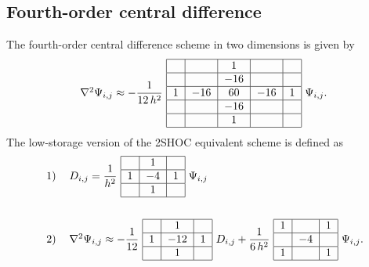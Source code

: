 \documentclass{article}
\begin{document}
\subsection{Fourth-order central difference}
\label{s:2d2shocstb}
The fourth-order central difference scheme in two dimensions is given by 
\begin{equation}
\label{2dnonhoc}
\begin{tabular}{c} 
$\nabla^2\Psi_{i,j} \approx -\dfrac{1}{12\,h^2}$
\begin{tabular}{|c|c|c|c|c|} \hline
  &     &   $1$ &     &   \\ \hline
  &     & $-16$ &     &   \\ \hline
$1$ & $-16$ &  $60$ & $-16$ & $1$ \\ \hline
  &     & $-16$ &     &   \\ \hline
  &     &   $1$ &     &   \\ \hline
\end{tabular}
$\Psi_{i,j}.$
\end{tabular}
\end{equation}
The low-storage version of the 2SHOC equivalent scheme is defined as \cite{ME_2SHOC}
\begin{alignat}{3}
&\begin{tabular}{ll} 
$1)$ & $D_{i,j} = \dfrac{1}{h^2}$ 
\begin{tabular}{|c|c|c|} \hline
  &  $1$ &   \\ \hline
$1$ & $-4$ & $1$ \\ \hline
  &  $1$ &  \\ \hline
\end{tabular}
$\Psi_{i,j}$
\end{tabular}
\\
\;&\; \notag
\\
&\begin{tabular}{ll} 
$2)$ & $\nabla^2\Psi_{i,j} \approx -\dfrac{1}{12}$
\begin{tabular}{|c|c|c|} \hline
  &   $1$ &   \\ \hline
$1$ & $-12$ & $1$ \\ \hline
  &   $1$ &   \\ \hline
\end{tabular}
$D_{i,j} + \dfrac{1}{6\,h^2}$  
\begin{tabular}{|c|c|c|} \hline
$1$ &    & $1$ \\ \hline
  & $-4$ &   \\ \hline
$1$ &    & $1$ \\ \hline
\end{tabular}
$\Psi_{i,j}.$
\end{tabular}
\end{alignat}
\end{document}

